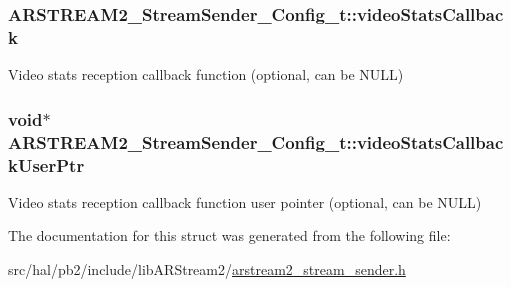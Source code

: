 \subsubsection[{\texorpdfstring{video\+Stats\+Callback}{videoStatsCallback}}]{ A\+R\+S\+T\+R\+E\+A\+M2\+\_\+\+Stream\+Sender\+\_\+\+Config\+\_\+t\+::video\+Stats\+Callback}\hypertarget{struct_a_r_s_t_r_e_a_m2___stream_sender___config__t_a8df6201776d9f2a6d39da012c67c4446}{}\label{struct_a_r_s_t_r_e_a_m2___stream_sender___config__t_a8df6201776d9f2a6d39da012c67c4446}
Video stats reception callback function (optional, can be N\+U\+LL) 
\subsubsection[{\texorpdfstring{video\+Stats\+Callback\+User\+Ptr}{videoStatsCallbackUserPtr}}]{\setlength{\rightskip}{0pt plus 5cm}void$\ast$ A\+R\+S\+T\+R\+E\+A\+M2\+\_\+\+Stream\+Sender\+\_\+\+Config\+\_\+t\+::video\+Stats\+Callback\+User\+Ptr}\hypertarget{struct_a_r_s_t_r_e_a_m2___stream_sender___config__t_af43cc8f7c970b1cdf97594a1c074f9ac}{}\label{struct_a_r_s_t_r_e_a_m2___stream_sender___config__t_af43cc8f7c970b1cdf97594a1c074f9ac}
Video stats reception callback function user pointer (optional, can be N\+U\+LL) 

The documentation for this struct was generated from the following file\+:\begin{DoxyCompactItemize}
\item 
src/hal/pb2/include/lib\+A\+R\+Stream2/\hyperlink{arstream2__stream__sender_8h}{arstream2\+\_\+stream\+\_\+sender.\+h}\end{DoxyCompactItemize}
